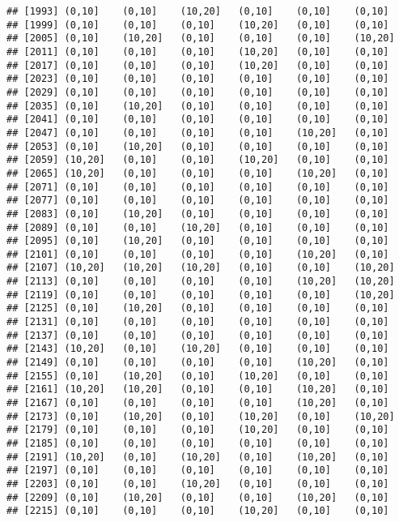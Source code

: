 \documentclass[]{article}
\begin{document}
\begin{verbatim}
## [1993] (0,10]    (0,10]    (10,20]   (0,10]    (0,10]    (0,10]   
## [1999] (0,10]    (0,10]    (0,10]    (10,20]   (0,10]    (0,10]   
## [2005] (0,10]    (10,20]   (0,10]    (0,10]    (0,10]    (10,20]  
## [2011] (0,10]    (0,10]    (0,10]    (10,20]   (0,10]    (0,10]   
## [2017] (0,10]    (0,10]    (0,10]    (10,20]   (0,10]    (0,10]   
## [2023] (0,10]    (0,10]    (0,10]    (0,10]    (0,10]    (0,10]   
## [2029] (0,10]    (0,10]    (0,10]    (0,10]    (0,10]    (0,10]   
## [2035] (0,10]    (10,20]   (0,10]    (0,10]    (0,10]    (0,10]   
## [2041] (0,10]    (0,10]    (0,10]    (0,10]    (0,10]    (0,10]   
## [2047] (0,10]    (0,10]    (0,10]    (0,10]    (10,20]   (0,10]   
## [2053] (0,10]    (10,20]   (0,10]    (0,10]    (0,10]    (0,10]   
## [2059] (10,20]   (0,10]    (0,10]    (10,20]   (0,10]    (0,10]   
## [2065] (10,20]   (0,10]    (0,10]    (0,10]    (10,20]   (0,10]   
## [2071] (0,10]    (0,10]    (0,10]    (0,10]    (0,10]    (0,10]   
## [2077] (0,10]    (0,10]    (0,10]    (0,10]    (0,10]    (0,10]   
## [2083] (0,10]    (10,20]   (0,10]    (0,10]    (0,10]    (0,10]   
## [2089] (0,10]    (0,10]    (10,20]   (0,10]    (0,10]    (0,10]   
## [2095] (0,10]    (10,20]   (0,10]    (0,10]    (0,10]    (0,10]   
## [2101] (0,10]    (0,10]    (0,10]    (0,10]    (10,20]   (0,10]   
## [2107] (10,20]   (10,20]   (10,20]   (0,10]    (0,10]    (10,20]  
## [2113] (0,10]    (0,10]    (0,10]    (0,10]    (10,20]   (10,20]  
## [2119] (0,10]    (0,10]    (0,10]    (0,10]    (0,10]    (10,20]  
## [2125] (0,10]    (10,20]   (0,10]    (0,10]    (0,10]    (0,10]   
## [2131] (0,10]    (0,10]    (0,10]    (0,10]    (0,10]    (0,10]   
## [2137] (0,10]    (0,10]    (0,10]    (0,10]    (0,10]    (0,10]   
## [2143] (10,20]   (0,10]    (10,20]   (0,10]    (0,10]    (0,10]   
## [2149] (0,10]    (0,10]    (0,10]    (0,10]    (10,20]   (0,10]   
## [2155] (0,10]    (10,20]   (0,10]    (10,20]   (0,10]    (0,10]   
## [2161] (10,20]   (10,20]   (0,10]    (0,10]    (10,20]   (0,10]   
## [2167] (0,10]    (0,10]    (0,10]    (0,10]    (10,20]   (0,10]   
## [2173] (0,10]    (10,20]   (0,10]    (10,20]   (0,10]    (10,20]  
## [2179] (0,10]    (0,10]    (0,10]    (10,20]   (0,10]    (0,10]   
## [2185] (0,10]    (0,10]    (0,10]    (0,10]    (0,10]    (0,10]   
## [2191] (10,20]   (0,10]    (10,20]   (0,10]    (10,20]   (0,10]   
## [2197] (0,10]    (0,10]    (0,10]    (0,10]    (0,10]    (0,10]   
## [2203] (0,10]    (0,10]    (10,20]   (0,10]    (0,10]    (0,10]   
## [2209] (0,10]    (10,20]   (0,10]    (0,10]    (10,20]   (0,10]   
## [2215] (0,10]    (0,10]    (0,10]    (10,20]   (0,10]    (0,10]   

\end{verbatim}
\end{document}
